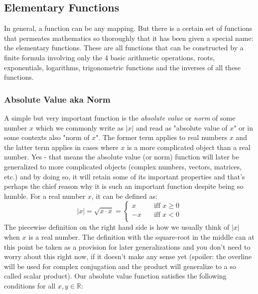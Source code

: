 \subsection{Elementary Functions}
In general, a function can be any mapping. But there is a certain set of functions that permeates mathematics so thoroughly that it has been given a special name: the elementary functions. These are all functions that can be constructed by a finite formula involving only the 4 basic arithmetic operations, roots, exponentials, logarithms, trigonometric functions and the inverses of all these functions.


\subsubsection{Absolute Value aka Norm}
A simple but very important function is the \emph{absolute value} or \emph{norm} of some number $x$ which we commonly write as $|x|$ and read as "absolute value of $x$" or in some contexts also "norm of $x$". The former term applies to real numbers $x$ and the latter term applies in cases where $x$ is a more complicated object than a real number. Yes - that means the absolute value (or norm) function will later be generalized to more complicated objects (complex numbers, vectors, matrices, etc.) and by doing so, it will retain some of its important properties and that's perhaps the chief reason why it is such an important function despite being so humble. For a real number $x$, it can be defined as:
\begin{equation}
 |x| = \sqrt{x \cdot \overline{x}} = 
\begin{cases} 
  x \quad & \text{iff } x \geq 0 \\
 -x \quad & \text{iff } x   <  0 \\
\end{cases} 
\end{equation}
The piecewise definition on the right hand side is how we usually think of $|x|$ when $x$ is a real number. The definition with the square-root in the middle can at this point be taken as a provision for later generalizations and you don't need to worry about this right now, if it doesn't make any sense yet (spoiler: the overline will be used for complex conjugation and the product will generalize to a so called scalar product). Our absolute value function satisfies the following conditions for all $x,y \in \mathbb{R}$:

